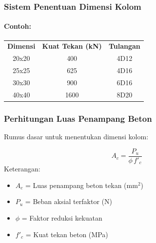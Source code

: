 \documentclass[../main.tex]{subfiles}
\begin{document}
\begin{frame}[t,mycolor=digiPH_white,mytitle=standard,light]
	\frametitle{Sistem Penentuan Dimensi Kolom}
	\framesubtitle{Contoh:}

\end{frame}




\begin{frame}[t,mycolor=digiPH_white,mytitle=standard,light]
	\begin{table}
		\centering
		\begin{tabular}{|c|c|c|}
			\hline
			\textbf{Dimensi}  &  \textbf{Kuat Tekan (kN)}  &  \textbf{Tulangan}  \\
			20x20             &  400                       &  4D12  \\
			25x25             &  625                       &  4D16  \\
			30x30             &  900                       &  6D16  \\
			40x40             &  1600                      &  8D20  \\
			\hline
		\end{tabular}
	\end{table}

\end{frame}


\begin{frame}[c,mycolor=digiPH_leaf,mytitle=standard,dark]

	\frametitle{Perhitungan Luas Penampang Beton}

	Rumus dasar untuk menentukan dimensi kolom:

	\begin{equation}
		A_c = \frac{P_u}{\phi \, f'_c}
	\end{equation}
	Keterangan:
	\begin{itemize}
		\item $A_c$ = Luas penampang beton tekan (mm$^2$)
		\item $P_u$ = Beban aksial terfaktor (N)
		\item $\phi$ = Faktor reduksi kekuatan
		\item $f'_c$ = Kuat tekan beton (MPa)
	\end{itemize}
\end{frame}
\end{document}
